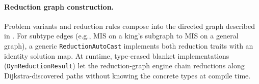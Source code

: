 \documentclass[conference]{IEEEtran}
\begin{document}
\paragraph{Reduction graph construction.}
Problem variants and reduction rules compose into the directed graph described in .
For subtype edges (e.g., MIS on a king's subgraph to MIS on a general graph), a generic \texttt{ReductionAutoCast} implements both reduction traits with an identity solution map.
At runtime, type-erased blanket implementations (\texttt{DynReductionResult}) let the reduction-graph engine chain reductions along Dijkstra-discovered paths without knowing the concrete types at compile time.
\end{document}

